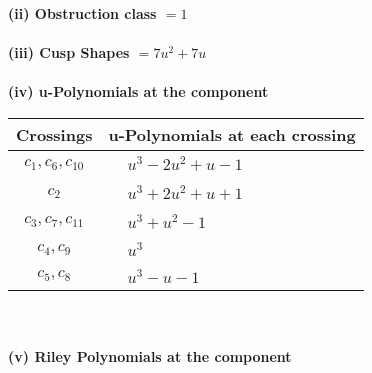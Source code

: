 \documentclass[1p]{elsarticle_modified}
\theoremstyle{definition}
\begin{document}
\flushleft \textbf{(ii) Obstruction class $= 1$}\\~\\
\flushleft \textbf{(iii) Cusp Shapes $= 7 u^2+7 u$}\\~\\
\newpage\renewcommand{\arraystretch}{1}
\flushleft \textbf{(iv) u-Polynomials at the component}\newline \\
\begin{tabular}{m{50pt}|m{274pt}}
Crossings & \hspace{64pt}u-Polynomials at each crossing \\
\hline $$\begin{aligned}c_{1},c_{6},c_{10}\end{aligned}$$&$\begin{aligned}
&u^3-2 u^2+u-1
\end{aligned}$\\
\hline $$\begin{aligned}c_{2}\end{aligned}$$&$\begin{aligned}
&u^3+2 u^2+u+1
\end{aligned}$\\
\hline $$\begin{aligned}c_{3},c_{7},c_{11}\end{aligned}$$&$\begin{aligned}
&u^3+u^2-1
\end{aligned}$\\
\hline $$\begin{aligned}c_{4},c_{9}\end{aligned}$$&$\begin{aligned}
&u^3
\end{aligned}$\\
\hline $$\begin{aligned}c_{5},c_{8}\end{aligned}$$&$\begin{aligned}
&u^3- u-1
\end{aligned}$\\
\hline
\end{tabular}\\~\\
\newpage\renewcommand{\arraystretch}{1}
\flushleft \textbf{(v) Riley Polynomials at the component}\newline \\
\end{document}
